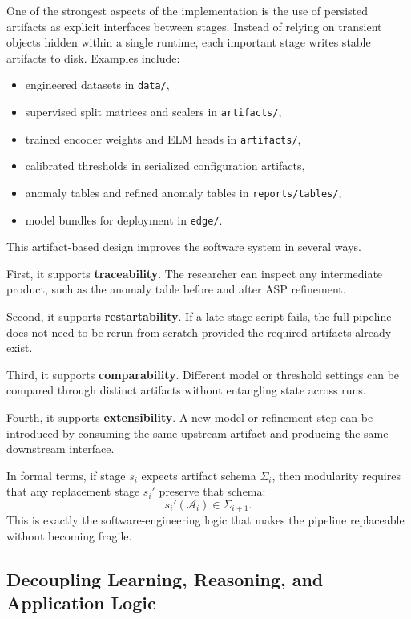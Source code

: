 One of the strongest aspects of the implementation is the use of persisted artifacts as explicit interfaces between stages. Instead of relying on transient objects hidden within a single runtime, each important stage writes stable artifacts to disk. Examples include:
\begin{itemize}
	\item engineered datasets in \texttt{data/},
	\item supervised split matrices and scalers in \texttt{artifacts/},
	\item trained encoder weights and ELM heads in \texttt{artifacts/},
	\item calibrated thresholds in serialized configuration artifacts,
	\item anomaly tables and refined anomaly tables in \texttt{reports/tables/},
	\item model bundles for deployment in \texttt{edge/}.
\end{itemize}

This artifact-based design improves the software system in several ways.

First, it supports \textbf{traceability}. The researcher can inspect any intermediate product, such as the anomaly table before and after ASP refinement.

Second, it supports \textbf{restartability}. If a late-stage script fails, the full pipeline does not need to be rerun from scratch provided the required artifacts already exist.

Third, it supports \textbf{comparability}. Different model or threshold settings can be compared through distinct artifacts without entangling state across runs.

Fourth, it supports \textbf{extensibility}. A new model or refinement step can be introduced by consuming the same upstream artifact and producing the same downstream interface.

In formal terms, if stage $s_i$ expects artifact schema $\Sigma_i$, then modularity requires that any replacement stage $s_i'$ preserve that schema:
\begin{equation}
	s_i'(\mathcal{A}_i) \in \Sigma_{i+1}.
	\label{eq:schema_contract}
\end{equation}
This is exactly the software-engineering logic that makes the pipeline replaceable without becoming fragile.

\subsection{Decoupling Learning, Reasoning, and Application Logic}

